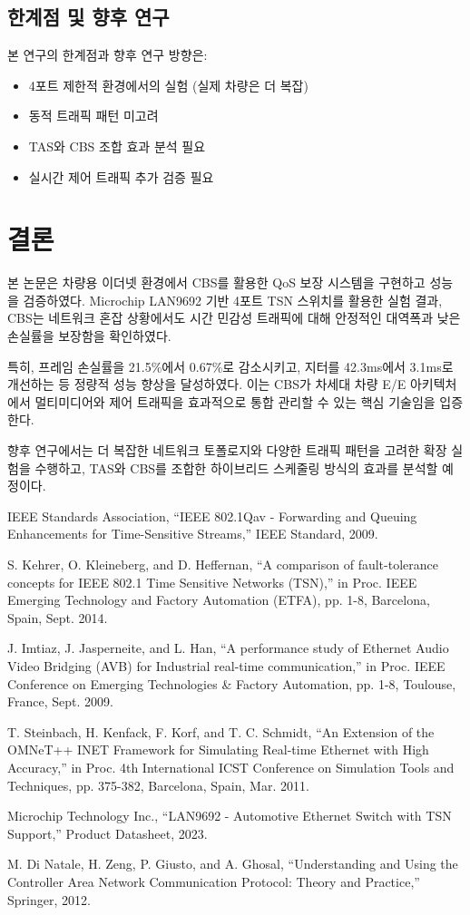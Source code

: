 \documentclass[10pt,twocolumn]{article}
\begin{document}
\subsection{한계점 및 향후 연구}
본 연구의 한계점과 향후 연구 방향은:
\begin{itemize}
\item 4포트 제한적 환경에서의 실험 (실제 차량은 더 복잡)
\item 동적 트래픽 패턴 미고려
\item TAS와 CBS 조합 효과 분석 필요
\item 실시간 제어 트래픽 추가 검증 필요
\end{itemize}

\section{결론}
본 논문은 차량용 이더넷 환경에서 CBS를 활용한 QoS 보장 시스템을 구현하고 성능을 검증하였다. Microchip LAN9692 기반 4포트 TSN 스위치를 활용한 실험 결과, CBS는 네트워크 혼잡 상황에서도 시간 민감성 트래픽에 대해 안정적인 대역폭과 낮은 손실률을 보장함을 확인하였다.

특히, 프레임 손실률을 21.5\%에서 0.67\%로 감소시키고, 지터를 42.3ms에서 3.1ms로 개선하는 등 정량적 성능 향상을 달성하였다. 이는 CBS가 차세대 차량 E/E 아키텍처에서 멀티미디어와 제어 트래픽을 효과적으로 통합 관리할 수 있는 핵심 기술임을 입증한다.

향후 연구에서는 더 복잡한 네트워크 토폴로지와 다양한 트래픽 패턴을 고려한 확장 실험을 수행하고, TAS와 CBS를 조합한 하이브리드 스케줄링 방식의 효과를 분석할 예정이다.


\begin{thebibliography}{99}
IEEE Standards Association, ``IEEE 802.1Qav - Forwarding and Queuing Enhancements for Time-Sensitive Streams,'' IEEE Standard, 2009.

S. Kehrer, O. Kleineberg, and D. Heffernan, ``A comparison of fault-tolerance concepts for IEEE 802.1 Time Sensitive Networks (TSN),'' in Proc. IEEE Emerging Technology and Factory Automation (ETFA), pp. 1-8, Barcelona, Spain, Sept. 2014.

J. Imtiaz, J. Jasperneite, and L. Han, ``A performance study of Ethernet Audio Video Bridging (AVB) for Industrial real-time communication,'' in Proc. IEEE Conference on Emerging Technologies \& Factory Automation, pp. 1-8, Toulouse, France, Sept. 2009.

T. Steinbach, H. Kenfack, F. Korf, and T. C. Schmidt, ``An Extension of the OMNeT++ INET Framework for Simulating Real-time Ethernet with High Accuracy,'' in Proc. 4th International ICST Conference on Simulation Tools and Techniques, pp. 375-382, Barcelona, Spain, Mar. 2011.

Microchip Technology Inc., ``LAN9692 - Automotive Ethernet Switch with TSN Support,'' Product Datasheet, 2023.

M. Di Natale, H. Zeng, P. Giusto, and A. Ghosal, ``Understanding and Using the Controller Area Network Communication Protocol: Theory and Practice,'' Springer, 2012.
\end{thebibliography}
\end{document}
